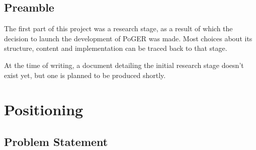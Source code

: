 \documentclass[11pt]{article}
\begin{document}
\subsection{Preamble}

The first part of this project was a research stage, as a result of which the decision to launch the development of PoGER was made. Most choices about its structure, content and implementation can be traced back to that stage.

At the time of writing, a document detailing the initial research stage doesn't exist yet, but one is planned to be produced shortly.






\newpage
\section{Positioning}

\subsection{Problem Statement}
\end{document}
